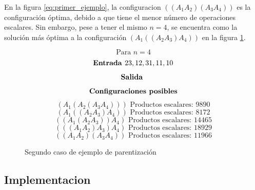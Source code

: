 \documentclass[12pt,twoside]{article}
\begin{document}
En la figura \ref{eq:primer_ejemplo}, la configuracion $((A_1A_2)(A_3A_4))$ es la configuraci\'on \'optima, debido a que tiene el menor n\'umero de operaciones escalares. Sin embargo, pese a tener el mismo $n=4$, se encuentra como la soluci\'on m\'as \'optima a la configuraci\'on $(A_1((A_2A_3)A_4))$ en la figura \ref{eq:segundo_ejemplo}.

\begin{figure}[ht]
    \centering
    \begin{equation*}
        \text{Para } n=4
    \end{equation*}
    \begin{equation*}
        \text{\textbf{Entrada }} 23,12,31,11,10
    \end{equation*}
    \begin{equation*}
        \text{\textbf{Salida }}
    \end{equation*}
    \begin{equation*}
        \text{\textbf{Configuraciones posibles}}
    \end{equation*}
    \begin{equation*}
        (A_1(A_2(A_3A_4))) \text{  Productos escalares: } 9890 
    \end{equation*}
    \begin{equation*}
        (A_1((A_2A_3)A_4)) \text{  Productos escalares: }8172
    \end{equation*}
    \begin{equation*}
        ((A_1(A_2A_3))A_4) \text{  Productos escalares: }14465
    \end{equation*}
    \begin{equation*}
        (((A_1A_2)A_3)A_4) \text{  Productos escalares: }18929
    \end{equation*}
    \begin{equation*}
        ((A_1A_2)(A_3A_4)) \text{  Productos escalares: }11966
    \end{equation*}
    \caption{Segundo caso de ejemplo de parentizaci\'on}
    \label{eq:segundo_ejemplo}
\end{figure}

\newpage
\vfill
\clearpage

\subsection{Implementacion}
\end{document}
